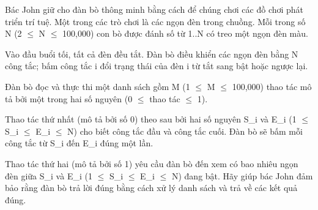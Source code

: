 Bác John giữ cho đàn bò thông minh bằng cách để chúng chơi các đồ chơi phát triển trí tuệ. Một trong các trò chơi là các ngọn đèn trong chuồng. Mỗi trong số N (2  $\le$  N  $\le$  100,000) con bò được đánh số từ 1..N có treo một ngọn đèn màu.  

   Vào đầu buổi tối, tất cả đèn đều tắt. Đàn bò điều khiển các ngọn đèn bằng N công tắc; bấm công tắc i đổi trạng thái của đèn i từ tắt sang bật hoặc ngược lại.  

   Đàn bò đọc và thực thi một danh sách gồm M (1  $\le$  M  $\le$  100,000) thao tác mô tả bởi một trong hai số nguyên (0  $\le$  thao tác  $\le$  1).  

   Thao tác thứ nhất (mô tả bởi số 0) theo sau bởi hai số nguyên S\_i và E\_i (1  $\le$  S\_i  $\le$  E\_i  $\le$  N) cho biết công tắc đầu và công tắc cuối. Đàn bò sẽ bấm mỗi công tắc từ S\_i đến E\_i đúng một lần.  

   Thao tác thứ hai (mô tả bởi số 1) yêu cầu đàn bò đến xem có bao nhiêu ngọn đèn giữa S\_i và E\_i (1  $\le$  S\_i  $\le$  E\_i  $\le$  N) đang bật. Hãy giúp bác John đảm bảo rằng đàn bò trả lời đúng bằng cách xử lý danh sách và trả về các kết quả đúng.  

\